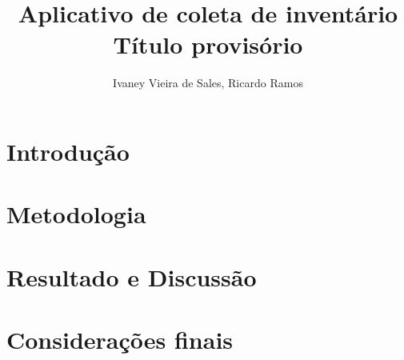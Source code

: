 \documentclass[12pt]{article}
\title{Aplicativo de coleta de inventário\\ Título provisório}
\author{Ivaney Vieira de Sales\inst{1}, Ricardo Ramos\inst{2}}
\begin{document}
 

\maketitle

\begin{resumo}

  
  
\end{resumo}

\begin{abstract}

  

\end{abstract}

\section{Introdução}



\section{Metodologia}



\section{Resultado e Discussão}



\section{Considerações finais}






\end{document}
